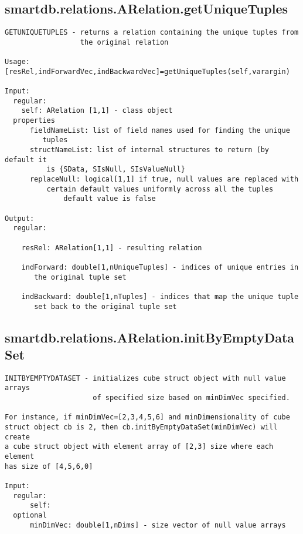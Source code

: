 \subsection{\texorpdfstring{smartdb.relations.ARelation.getUniqueTuples}{getUniqueTuples}}\label{method:smartdb.relations.ARelation.getUniqueTuples}
\begin{verbatim}
GETUNIQUETUPLES - returns a relation containing the unique tuples from
                  the original relation

Usage: [resRel,indForwardVec,indBackwardVec]=getUniqueTuples(self,varargin)

Input:
  regular:
    self: ARelation [1,1] - class object
  properties
      fieldNameList: list of field names used for finding the unique
         tuples
      structNameList: list of internal structures to return (by default it
          is {SData, SIsNull, SIsValueNull}
      replaceNull: logical[1,1] if true, null values are replaced with
          certain default values uniformly across all the tuples
              default value is false

Output:
  regular:

    resRel: ARelation[1,1] - resulting relation

    indForward: double[1,nUniqueTuples] - indices of unique entries in
       the original tuple set

    indBackward: double[1,nTuples] - indices that map the unique tuple
       set back to the original tuple set
\end{verbatim}
\subsection{\texorpdfstring{smartdb.relations.ARelation.initByEmptyDataSet}{initByEmptyDataSet}}\label{method:smartdb.relations.ARelation.initByEmptyDataSet}
\begin{verbatim}
INITBYEMPTYDATASET - initializes cube struct object with null value arrays
                     of specified size based on minDimVec specified.

For instance, if minDimVec=[2,3,4,5,6] and minDimensionality of cube
struct object cb is 2, then cb.initByEmptyDataSet(minDimVec) will create
a cube struct object with element array of [2,3] size where each element
has size of [4,5,6,0]

Input:
  regular:
      self:
  optional
      minDimVec: double[1,nDims] - size vector of null value arrays
\end{verbatim}
